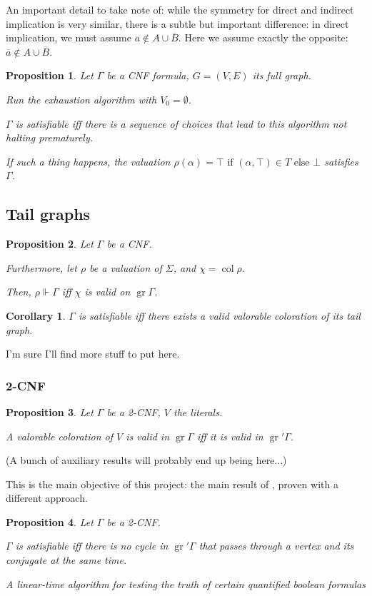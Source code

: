 \documentclass[11pt]{article}
\newcommand{\conj}[1]{\overline{#1}}
\newcommand{\sat}{\Vdash}
\DeclareMathOperator{\gr}{gr}
\DeclareMathOperator{\col}{col}
\newtheorem{prop}{Proposition}
\newtheorem{corollary}{Corollary}
\begin{document}
An important detail to take note of: while the symmetry for direct and indirect implication is very similar, there is a subtle but important difference: in direct implication, we must assume $a \not \in A \cup \conj B$. Here we assume exactly the opposite: $\conj a \not \in A \cup \conj B$.

\begin{prop}
Let $\Gamma$ be a CNF formula, $G = (V, E)$ its full graph.

Run the exhaustion algorithm with $V_0 = \emptyset$.

$\Gamma$ is satisfiable iff there is a sequence of choices that lead to this algorithm not halting prematurely.

If such a thing happens, the valuation $\rho(\alpha) = \top \text{ if } (\alpha, \top) \in T \text { else } \bot$ satisfies $\Gamma$.
\end{prop}

\subsection{Tail graphs}

\begin{prop}
Let $\Gamma$ be a CNF.

Furthermore, let $\rho$ be a valuation of $\Sigma$, and $\chi = \col \rho$.

Then, $\rho \sat \Gamma$ iff $\chi$ is valid on $\gr \Gamma$.
\end{prop}

\begin{corollary}
$\Gamma$ is satisfiable iff there exists a valid valorable coloration of its tail graph.
\end{corollary}

I'm sure I'll find more stuff to put here.

\subsubsection{2-CNF}

\begin{prop}
Let $\Gamma$ be a 2-CNF, $V$ the literals.

A valorable coloration of $V$ is valid in $\gr \Gamma$ iff it is valid in $\gr' \Gamma$.
\end{prop}

(A bunch of auxiliary results will probably end up being here...)

This is the main objective of this project: the main result of \cite{2cnf}, proven with a different approach.

\begin{prop}
Let $\Gamma$ be a 2-CNF.

$\Gamma$ is satisfiable iff there is no cycle in $\gr' \Gamma$ that passes through a vertex and its conjugate at the same time.
\end{prop}


\begin{thebibliography}{1}

\textit{A linear-time algorithm for testing the truth of certain quantified boolean formulas}

\end{thebibliography}
\end{document}
